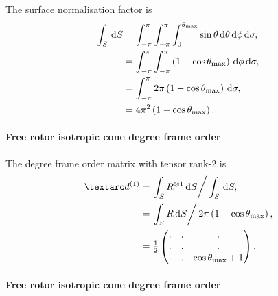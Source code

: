 The surface normalisation factor is
\begin{subequations}
\begin{align}
    \int_S \,\mathrm{d} S &= \int_{-\pi}^{\pi} \int_{-\pi}^{\pi} \int_{0}^{\theta_\textrm{max}} \sin\theta \,\mathrm{d}\theta \,\mathrm{d}\phi \,\mathrm{d}\sigma , \\
                   &= \int_{-\pi}^{\pi} \int_{-\pi}^{\pi} \left( 1 - \cos\theta_\textrm{max} \right) \,\mathrm{d}\phi \,\mathrm{d}\sigma , \\
                   &= \int_{-\pi}^{\pi} 2\pi \left( 1 - \cos\theta_\textrm{max} \right) \,\mathrm{d}\sigma , \\
                   &= 4\pi^2 \left( 1 - \cos\theta_\textrm{max} \right) .
\end{align}
\end{subequations}


\paragraph{Free rotor isotropic cone  degree frame order}

The  degree frame order matrix with tensor rank-2 is
\begin{subequations} \label{eq: iso cone, free rotor 1st degree frame order matrix}
\begin{align}
    \FOone &= \left. \int_S R^{\otimes 1} \diff S \right / \int_S \diff S , \\
           &= \left. \int_S R \diff S \right / 2\pi \left( 1 - \cos\conethetamax \right) , \\
           &= \half \begin{pmatrix}
                  . & . & . \\
                  . & . & . \\
                  . & . & \cos\conethetamax + 1 \\
              \end{pmatrix} .
\end{align}
\end{subequations}


\paragraph{Free rotor isotropic cone  degree frame order}



